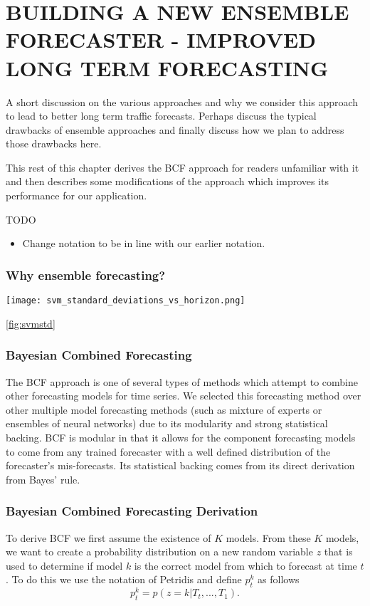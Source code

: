 \chapter{BUILDING A NEW ENSEMBLE FORECASTER - IMPROVED LONG TERM FORECASTING}
\label{ch:BCF}
A short discussion on the various approaches and why we consider this approach to lead to better long term traffic forecasts.  Perhaps discuss the typical drawbacks of ensemble approaches and finally discuss how we plan to address those drawbacks here.

This rest of this chapter derives the BCF approach for readers unfamiliar with it and then describes some modifications of the approach which improves its performance for our application.

TODO
\begin{itemize}
	\item Change notation to be in line with our earlier notation.

\end{itemize}

\subsection{Why ensemble forecasting?}
\begin{figure*}[t]
\centering
\texttt{[image: svm\_standard\_deviations\_vs\_horizon.png]}
\caption{Standard deviation of support vector machine residuals for all Wednesdays in MERL dataset.  Time index represents 10 minute intervals from 6:00am to 7:00pm.}
\label{fig:svmstd}
\end{figure*}

\ref{fig:svmstd}


\subsection{Bayesian Combined Forecasting}
The BCF approach \cite{Petridis2001} is one of several types of methods which attempt to combine other forecasting models for time series. We selected this forecasting method over other multiple model forecasting methods (such as mixture of experts or ensembles of neural networks) due to its modularity and strong statistical backing.  BCF is modular in that it allows for the component forecasting models to come from any trained forecaster with a well defined distribution of the forecaster's mis-forecasts.  Its statistical backing comes from its direct derivation from Bayes' rule.

\subsection{Bayesian Combined Forecasting Derivation}
To derive BCF we first assume the existence of $K$ models.  From these $K$ models, we want to create a probability distribution on a new random variable $z$ that is used to determine if model $k$ is the correct model from which to forecast at time $t$.  To do this we use the notation of Petridis \cite{Petridis2001} and define $p_{t}^{k}$ as follows
\begin{equation}
p_{t}^{k} = p(z = k | T_{t}, ..., T_{1}).
\end{equation}

